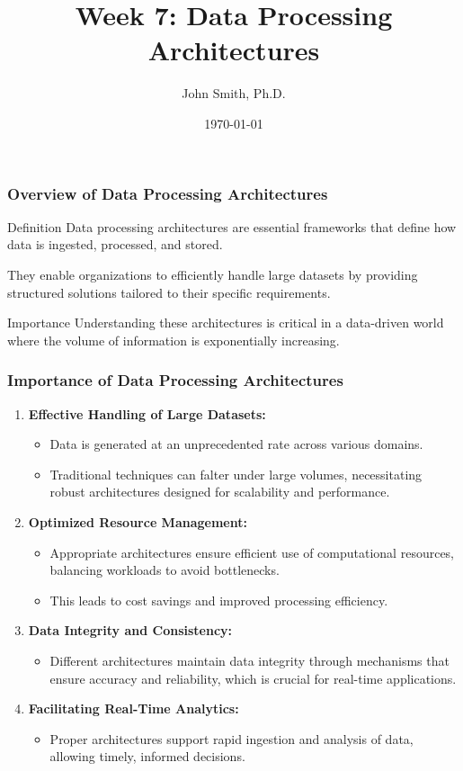 \documentclass[aspectratio=169]{beamer}
\title[Week 7: Data Processing Architectures]{Week 7: Data Processing Architectures}
\subtitle{}
\author[J. Smith]{John Smith, Ph.D.}
\institute[University Name]{
  Department of Computer Science\\
  University Name\\
  \vspace{0.3cm}
  Email: email@university.edu\\
  Website: www.university.edu
}
\date{\today}
\begin{document}
\frame{\titlepage}

\begin{frame}[fragile]
  \titlepage
\end{frame}

\begin{frame}[fragile]
  \frametitle{Overview of Data Processing Architectures}
  \begin{block}{Definition}
    Data processing architectures are essential frameworks that define how data is ingested, processed, and stored.
  \end{block}
  They enable organizations to efficiently handle large datasets by providing structured solutions tailored to their specific requirements.
  
  \begin{block}{Importance}
    Understanding these architectures is critical in a data-driven world where the volume of information is exponentially increasing.
  \end{block}
\end{frame}

\begin{frame}[fragile]
  \frametitle{Importance of Data Processing Architectures}
  \begin{enumerate}
    \item \textbf{Effective Handling of Large Datasets:}
    \begin{itemize}
      \item Data is generated at an unprecedented rate across various domains.
      \item Traditional techniques can falter under large volumes, necessitating robust architectures designed for scalability and performance.
    \end{itemize}
    
    \item \textbf{Optimized Resource Management:}
    \begin{itemize}
      \item Appropriate architectures ensure efficient use of computational resources, balancing workloads to avoid bottlenecks.
      \item This leads to cost savings and improved processing efficiency.
    \end{itemize}
    
    \item \textbf{Data Integrity and Consistency:}
    \begin{itemize}
      \item Different architectures maintain data integrity through mechanisms that ensure accuracy and reliability, which is crucial for real-time applications.
    \end{itemize}
    
    \item \textbf{Facilitating Real-Time Analytics:}
    \begin{itemize}
      \item Proper architectures support rapid ingestion and analysis of data, allowing timely, informed decisions.
    \end{itemize}
  \end{enumerate}
\end{frame}
\end{document}
